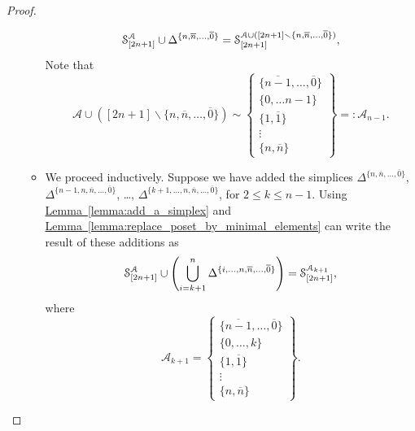 \documentclass[main.tex]{subfiles}
\begin{document}
\begin{proof}
\begin{enumerate}
\begin{itemize}
          \begin{equation*}
            \S^{\mathcal{A}}_{[2n+1]} \cup \Delta^{\{n, \overline{n}, \ldots, \overline{0}\}} = \S^{\mathcal{A} \cup ([2n+1] \smallsetminus \{n, \overline{n}, \ldots, \overline{0}\})}_{[2n+1]},
          \end{equation*}
          Note that
          \begin{equation*}
            \mathcal{A} \cup ([2n+1] \smallsetminus \{n, \overline{n}, \ldots, \overline{0}\}) \sim \left\{ \substack{ \{\overline{n-1}, \ldots, \overline{0}\} \\ \{0, \ldots n-1\} \\ \{1, \overline{1}\} \\ \vdots \\ \{n, \overline{n}\} } \right\} =: \mathcal{A}_{n-1}.
          \end{equation*}

        \item We proceed inductively. Suppose we have added the simplices $\Delta^{\{n, \overline{n}, \ldots, \overline{0}\}}$, $\Delta^{\{n-1, n, \overline{n}, \ldots, \overline{0}\}}$, \dots, $\Delta^{\{k+1, \ldots, n, \overline{n}, \ldots, \overline{0}\}}$, for $2 \leq k \leq n-1$. Using \hyperref[lemma:add_a_simplex]{Lemma~\ref*{lemma:add_a_simplex}} and \hyperref[lemma:replace_poset_by_minimal_elements]{Lemma~\ref*{lemma:replace_poset_by_minimal_elements}} can write the result of these additions as
          \begin{equation*}
            \S^{\mathcal{A}}_{[2n+1]} \cup \left( \bigcup_{i = k+1}^{n} \Delta^{\{i, \ldots, n, \overline{n}, \ldots, \overline{0}\}}\right) = \S^{\mathcal{A}_{k+1}}_{[2n+1]},
          \end{equation*}
          where 
          \begin{equation*}
            \mathcal{A}_{k+1} = \left\{ \substack{ \{\overline{n-1}, \ldots, \overline{0}\} \\ \{0, \ldots, k\} \\ \{1, \overline{1}\} \\ \vdots \\ \{n, \overline{n}\} } \right\}.
          \end{equation*}


\end{itemize}
\end{enumerate}
\end{proof}
\end{document}
